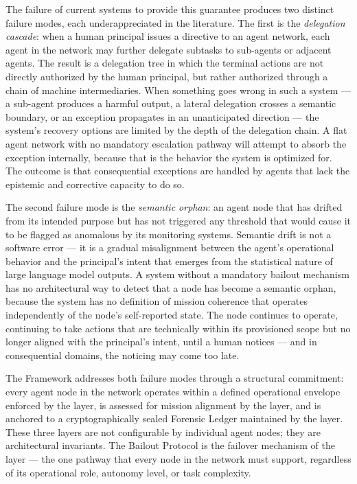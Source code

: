 The failure of current systems to provide this guarantee produces two distinct failure modes, each underappreciated in the literature. The first is the \emph{delegation cascade}: when a human principal issues a directive to an agent network, each agent in the network may further delegate subtasks to sub-agents or adjacent agents. The result is a delegation tree in which the terminal actions are not directly authorized by the human principal, but rather authorized through a chain of machine intermediaries. When something goes wrong in such a system — a sub-agent produces a harmful output, a lateral delegation crosses a semantic boundary, or an exception propagates in an unanticipated direction — the system's recovery options are limited by the depth of the delegation chain. A flat agent network with no mandatory escalation pathway will attempt to absorb the exception internally, because that is the behavior the system is optimized for. The outcome is that consequential exceptions are handled by agents that lack the epistemic and corrective capacity to do so.

The second failure mode is the \emph{semantic orphan}: an agent node that has drifted from its intended purpose but has not triggered any threshold that would cause it to be flagged as anomalous by its monitoring systems. Semantic drift is not a software error — it is a gradual misalignment between the agent's operational behavior and the principal's intent that emerges from the statistical nature of large language model outputs. A system without a mandatory bailout mechanism has no architectural way to detect that a node has become a semantic orphan, because the system has no definition of mission coherence that operates independently of the node's self-reported state. The node continues to operate, continuing to take actions that are technically within its provisioned scope but no longer aligned with the principal's intent, until a human notices — and in consequential domains, the noticing may come too late.

The \bxthree{} Framework addresses both failure modes through a structural commitment: every agent node in the network operates within a defined operational envelope enforced by the \bounds{} layer, is assessed for mission alignment by the \purpose{} layer, and is anchored to a cryptographically sealed Forensic Ledger maintained by the \fact{} layer. These three layers are not configurable by individual agent nodes; they are architectural invariants. The Bailout Protocol is the failover mechanism of the \bounds{} layer — the one pathway that every node in the network must support, regardless of its operational role, autonomy level, or task complexity.

